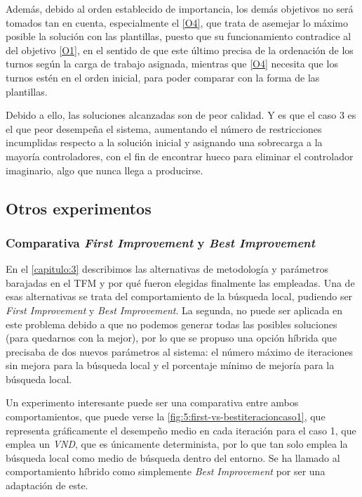 Además, debido al orden establecido de importancia, los demás objetivos no será tomados tan en cuenta, especialmente el \ref{O4}, que trata de asemejar lo máximo posible la solución con las plantillas, puesto que su funcionamiento contradice al del objetivo \ref{O1}, en el sentido de que este último precisa de la ordenación de los turnos según la carga de trabajo asignada, mientras que \ref{O4} necesita que los turnos estén en el orden inicial, para poder comparar con la forma de las plantillas. %

Debido a ello, las soluciones alcanzadas son de peor calidad. Y es que el caso 3 es el que peor desempeña el sistema, aumentando el número de restricciones incumplidas respecto a la solución inicial y asignando una sobrecarga a la mayoría controladores, con el fin de encontrar hueco para eliminar el controlador imaginario, algo que nunca llega a producirse.


\subsection{Otros experimentos}

\subsubsection{Comparativa \textit{First Improvement} y \textit{Best Improvement}}

En el \autoref{capitulo:3} describimos las alternativas de metodología y parámetros barajadas en el TFM y por qué fueron elegidas finalmente las empleadas. Una de esas alternativas se trata del comportamiento de la búsqueda local, pudiendo ser \textit{First Improvement} y \textit{Best Improvement}. La segunda, no puede ser aplicada en este problema debido a que no podemos generar todas las posibles soluciones (para quedarnos con la mejor), por lo que se propuso una opción híbrida que precisaba de dos nuevos parámetros al sistema: el número máximo de iteraciones sin mejora para la búsqueda local y el porcentaje mínimo de mejoría para la búsqueda local.

Un experimento interesante puede ser una comparativa entre ambos comportamientos, que puede verse la \autoref{fig:5:first-vs-bestiteracioncaso1}, que representa gráficamente el desempeño medio en cada iteración para el caso 1, que emplea un \textit{VND}, que es únicamente determinista, por lo que tan solo emplea la búsqueda local como medio de búsqueda dentro del entorno. Se ha llamado al comportamiento híbrido como simplemente \textit{Best Improvement} por ser una adaptación de este.

